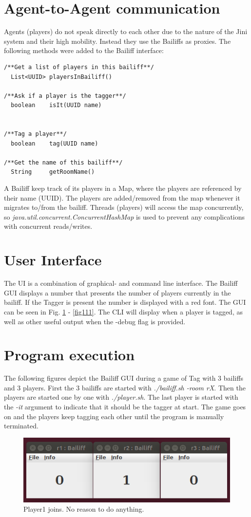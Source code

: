 \documentclass[conference, a4paper]{IEEEtran}
\begin{document}
\section{Agent-to-Agent communication}
Agents (players) do not speak directly to each other due to the nature of the Jini system and their high mobility. Instead they use the Bailiffs as proxies. The following methods were added to the Bailiff interface:
\begin{center}
\begin{verbatim}
/**Get a list of players in this bailiff**/
  List<UUID> playersInBailiff()
    
/**Ask if a player is the tagger**/
  boolean    isIt(UUID name)
    
    
/**Tag a player**/
  boolean    tag(UUID name)
    
/**Get the name of this bailiff**/
  String     getRoomName()
\end{verbatim}
\end{center}
A Bailiff keep track of its players in a Map, where the players are referenced by their name (UUID). The players are added/removed from the map whenever it migrates to/from the bailiff. Threads (players) will access the map concurrently, so \textit{java.util.concurrent.ConcurrentHashMap} is used to prevent any complications with concurrent reads/writes.

\section{User Interface}
The UI is a combination of graphical- and command line interface. The Bailiff GUI displays a number that presents the number of players currently in the bailiff. If the Tagger is present the number is displayed with a red font. The GUI can be seen in Fig. \ref{fig010} - \ref{fig111}. The CLI will display when a player is tagged, as well as other useful output when the -debug flag is provided.

\section{Program execution}
The following figures depict the Bailiff GUI during a game of Tag with 3 bailiffs and 3 players. First the 3 bailiffs are started with \textit{./bailiff.sh -room rX}. Then the players are started one by one with \textit{./player.sh}. The last player is started with the \textit{-it} argument to indicate that it should be the tagger at start. The game goes on and the players keep tagging each other until the program is manually terminated.
\begin{figure}[h!]
	\centering
	\includegraphics[scale=0.4]{010}
	\caption{Player1 joins. No reason to do anything.}
	\label{fig010}
\end{figure}
\end{document}
